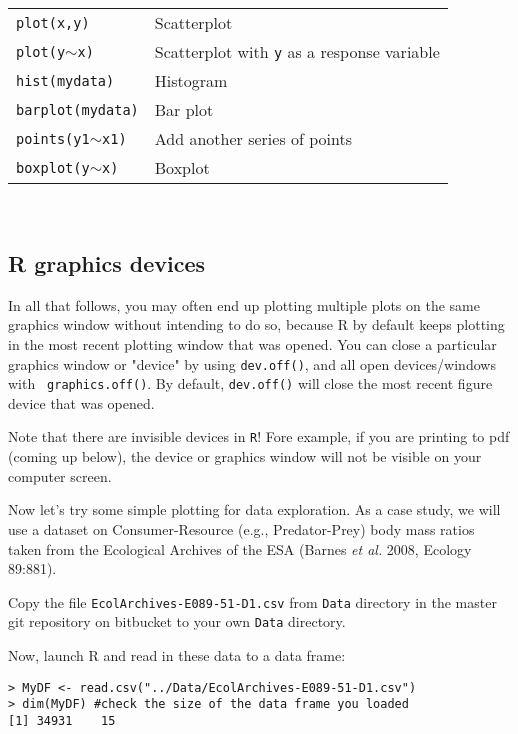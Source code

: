 \begin{tabular}{p{3.1cm} p{10cm}} 
{\tt plot(x,y)} & Scatterplot\\
{\tt plot(y$\sim$x)} & Scatterplot with {\tt y} as a response variable \\
{\tt hist(mydata)} & Histogram\\
{\tt barplot(mydata)} & Bar plot\\
{\tt points(y1$\sim$x1)} & Add another series of points\\
{\tt boxplot(y$\sim$x)} & Boxplot\\
\end{tabular}\\

\subsection{R graphics devices}

In all that follows, you may often end up plotting multiple plots on 
the same graphics window without intending to do so, because R by 
default keeps plotting in the most recent plotting window that was 
opened. You can close a particular graphics window or "device" by using 
{\tt dev.off()}, and all open devices/windows with {\tt 
graphics.off()}. By default, {\tt dev.off()} will close the most recent 
figure device that was opened. 

\begin{tipbox}
Note that there are invisible devices in {\tt R}! Fore example, if you are 
	printing to pdf (coming up below), the device or graphics window will 
	not be visible on your computer screen. 
\end{tipbox}

Now let's try some simple plotting for data exploration. As a 
case study, we will use a dataset on Consumer-Resource (e.g., 
Predator-Prey) body mass ratios taken from the Ecological Archives of 
the ESA (Barnes {\em et al.} 2008, Ecology 89:881).

\begin{compactitem}[$\quad\star$]
	\item Copy the file {\tt EcolArchives-E089-51-D1.csv} from {\tt Data} directory in the master git repository on bitbucket to your own {\tt Data} directory. 
	\item Now, launch R and read in these data to a data frame:
\begin{lstlisting}
> MyDF <- read.csv("../Data/EcolArchives-E089-51-D1.csv")
> dim(MyDF) #check the size of the data frame you loaded
[1] 34931    15
\end{lstlisting}
\end{compactitem}

